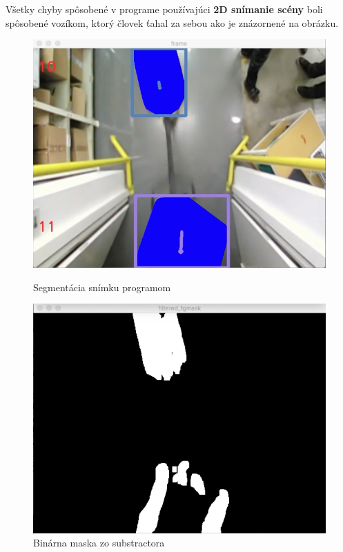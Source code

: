 Všetky chyby spôsobené v programe používajúci \textbf{2D snímanie scény} boli spôsobené vozíkom, ktorý človek ťahal za sebou ako je znázornené na obrázku. 

\begin{figure}[H]
  \centering
  \begin{minipage}[b]{0.43\textwidth}
    \includegraphics[width=\textwidth]{images/handCard}
    \caption{Segmentácia snímku programom}
  \end{minipage}
  \hfill
  \begin{minipage}[b]{0.43\textwidth}
    \includegraphics[width=\textwidth]{images/handCard_fmask}
    \caption{Binárna maska zo substractora}
  \end{minipage}
\end{figure}  

